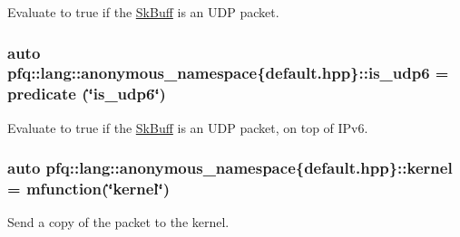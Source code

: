 Evaluate to {\ttfamily true} if the \hyperlink{structpfq_1_1lang_1_1SkBuff}{Sk\+Buff} is an U\+D\+P packet. 

\hypertarget{namespacepfq_1_1lang_1_1anonymous__namespace_02default_8hpp_03_a8f3f79760f7be2ce30db5025bff887a6}{
\subsubsection[{is\+\_\+udp6}]{\setlength{\rightskip}{0pt plus 5cm}auto pfq\+::lang\+::anonymous\+\_\+namespace\{default.\+hpp\}\+::is\+\_\+udp6 = {\bf predicate} (\char`\"{}is\+\_\+udp6\char`\"{})}}\label{namespacepfq_1_1lang_1_1anonymous__namespace_02default_8hpp_03_a8f3f79760f7be2ce30db5025bff887a6}


Evaluate to {\ttfamily true} if the \hyperlink{structpfq_1_1lang_1_1SkBuff}{Sk\+Buff} is an U\+D\+P packet, on top of I\+Pv6. 

\hypertarget{namespacepfq_1_1lang_1_1anonymous__namespace_02default_8hpp_03_a93294225145f96c6aa6cf0cedfa19103}{
\subsubsection[{kernel}]{\setlength{\rightskip}{0pt plus 5cm}auto pfq\+::lang\+::anonymous\+\_\+namespace\{default.\+hpp\}\+::kernel = {\bf mfunction}(\char`\"{}kernel\char`\"{})}}\label{namespacepfq_1_1lang_1_1anonymous__namespace_02default_8hpp_03_a93294225145f96c6aa6cf0cedfa19103}


Send a copy of the packet to the kernel. 

